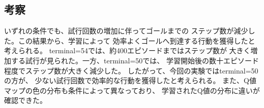 \documentclass[a4paper,11pt]{ltjsarticle}
\begin{document}
\subsection*{考察}
  いずれの条件でも、試行回数の増加に伴ってゴールまでの
ステップ数が減少した。この結果から、学習によって
効率よくゴールへ到達する行動を獲得したと考えられる。
terminal=54では、約400エピソードまではステップ数が
大きく増加する試行が見られた。一方、terminal=50では、
学習開始後の数十エピソード程度でステップ数が大きく減少した。
したがって、今回の実験ではterminal=50の方が、
少ない試行回数で効率的な行動を獲得したと考えられる。
また、Q値マップの色の分布も条件によって異なっており、
学習されたQ値の分布に違いが確認できた。

\section*{}
  
\end{document}
